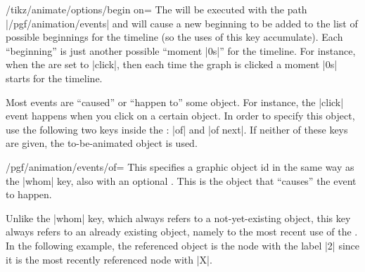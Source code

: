 \begin{key}{/tikz/animate/options/begin on=}
    The  will be executed with the path |/pgf/animation/events|
    and will cause a new beginning to be added to the list of possible
    beginnings for the timeline (so the uses of this key accumulate). Each
    ``beginning'' is just another possible ``moment |0s|'' for the timeline.
    For instance, when the  are set to |click|, then each time
    the graph is clicked a moment |0s| starts for the timeline.

    Most events are ``caused'' or ``happen to'' some object. For instance, the
    |click| event happens when you click on a certain object. In order to
    specify this object, use the following two keys inside the :
    |of| and |of next|. If neither of these keys are given, the to-be-animated
    object is used.

    \begin{key}{/pgf/animation/events/of=}
        This specifies a graphic object id in the same way as the |whom| key,
        also with an optional . This is the object that ``causes''
        the event to happen.

        Unlike the |whom| key, which always refers to a not-yet-existing
        object, this key always refers to an already existing object, namely to
        the most recent use of the . In the following example, the
        referenced object is the node with the label |2| since it is the most
        recently referenced node with  |X|.
\begin{codeexample}[width=3cm,preamble={\usetikzlibrary{animations}}]
\end{codeexample}
    \end{key}


\end{key}
